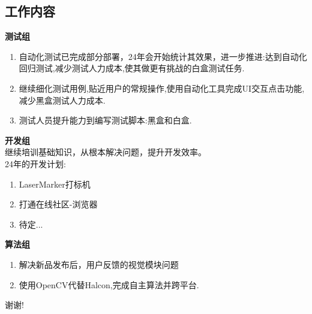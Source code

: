 \documentclass[AutoFakeBold,AutoFakeSlant]{beamer}
\begin{document}
	\subsection{工作内容}
	\begin{frame}[fragile]
	\large
	
	\begin{minipage}[l]{\linewidth}
		\footnotesize 
		\linespread{1.5} \selectfont
		\textbf{\large 测试组}
		\begin{enumerate}
			\item 自动化测试已完成部分部署，24年会开始统计其效果，进一步推进:达到自动化回归测试,减少测试人力成本,使其做更有挑战的白盒测试任务.
			\item 继续细化测试用例,贴近用户的常规操作,使用自动化工具完成UI交互点击功能,减少黑盒测试人力成本.
			\item 测试人员提升能力到编写测试脚本:黑盒和白盒.
		\end{enumerate}
	\end{minipage}
	
	\bigskip
	\bigskip
	
	\begin{minipage}[l]{0.45\linewidth}
		\footnotesize 
		\textbf{\large 开发组}\\
		继续培训基础知识，从根本解决问题，提升开发效率。\\
		24年的开发计划:
		\begin{enumerate}
			\item LaserMarker打标机
			\item 打通在线社区-浏览器
			\item 待定...
		\end{enumerate}
	\end{minipage}\hfill
	\begin{minipage}[l]{0.45\linewidth}
		\footnotesize 
		\textbf{\large 算法组}
		\begin{enumerate}
			\item 解决新品发布后，用户反馈的视觉模块问题
			\item 使用OpenCV代替Halcon,完成自主算法并跨平台.
		\end{enumerate}
	\end{minipage}
	\end{frame}
		
	\begin{frame}[fragile]
		\begin{center}
			\Huge
			谢谢!
		\end{center}
	\end{frame}
\end{document}
